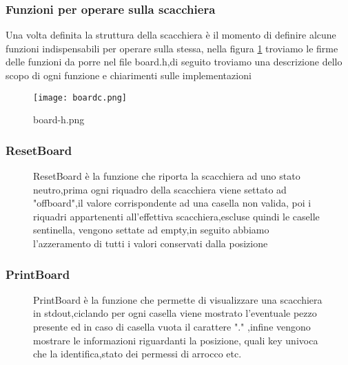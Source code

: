 \subsubsection{Funzioni per operare sulla scacchiera}
Una volta definita la struttura della scacchiera è il momento di definire alcune funzioni indispensabili per operare sulla stessa,
nella figura \ref{scacchierah} troviamo le firme delle funzioni da porre nel file board.h,di seguito troviamo una descrizione dello scopo di ogni funzione e chiarimenti sulle implementazioni
\begin{figure}[H]
    \centering
    \texttt{[image: boardc.png]}
    \caption{ board-h.png}
    \label{scacchierah}
\end{figure}


\subsubsection{ResetBoard}
\begin{figure}[H]
    \begin{minipage}[t]{.63\textwidth}
        \centering {}
    \end{minipage}
    \begin{minipage}[t]{0.35\textwidth}
        \large{ResetBoard è la funzione che riporta la scacchiera ad uno stato neutro,prima ogni riquadro della scacchiera viene settato ad "offboard",il valore corrispondente ad una casella non valida,
            poi i riquadri appartenenti all'effettiva scacchiera,escluse quindi le caselle sentinella, vengono settate ad empty,in seguito abbiamo l'azzeramento di tutti i valori conservati dalla posizione}
    \end{minipage}
\end{figure}



\subsubsection{PrintBoard}
\begin{figure}[H]
    \begin{minipage}[t]{.63\textwidth}
        \centering {}
    \end{minipage}
    \begin{minipage}[t]{0.35\textwidth}
        \small{PrintBoard è la funzione che permette di visualizzare una scacchiera in stdout,ciclando per ogni casella viene mostrato l'eventuale pezzo presente ed in caso di casella vuota il carattere "." ,infine
            vengono mostrare le informazioni riguardanti la posizione, quali key univoca che la identifica,stato dei permessi di arrocco etc.}
    \end{minipage}
\end{figure}



